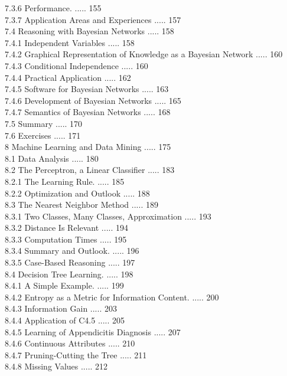 \documentclass[10pt]{book}
\begin{document}
7.3.6 Performance. ..... 155\\
7.3.7 Application Areas and Experiences ..... 157\\
7.4 Reasoning with Bayesian Networks ..... 158\\
7.4.1 Independent Variables ..... 158\\
7.4.2 Graphical Representation of Knowledge as a Bayesian Network ..... 160\\
7.4.3 Conditional Independence ..... 160\\
7.4.4 Practical Application ..... 162\\
7.4.5 Software for Bayesian Networks ..... 163\\
7.4.6 Development of Bayesian Networks ..... 165\\
7.4.7 Semantics of Bayesian Networks ..... 168\\
7.5 Summary ..... 170\\
7.6 Exercises ..... 171\\
8 Machine Learning and Data Mining ..... 175\\
8.1 Data Analysis ..... 180\\
8.2 The Perceptron, a Linear Classifier ..... 183\\
8.2.1 The Learning Rule. ..... 185\\
8.2.2 Optimization and Outlook ..... 188\\
8.3 The Nearest Neighbor Method ..... 189\\
8.3.1 Two Classes, Many Classes, Approximation ..... 193\\
8.3.2 Distance Is Relevant ..... 194\\
8.3.3 Computation Times ..... 195\\
8.3.4 Summary and Outlook. ..... 196\\
8.3.5 Case-Based Reasoning ..... 197\\
8.4 Decision Tree Learning. ..... 198\\
8.4.1 A Simple Example. ..... 199\\
8.4.2 Entropy as a Metric for Information Content. ..... 200\\
8.4.3 Information Gain ..... 203\\
8.4.4 Application of C4.5 ..... 205\\
8.4.5 Learning of Appendicitis Diagnosis ..... 207\\
8.4.6 Continuous Attributes ..... 210\\
8.4.7 Pruning-Cutting the Tree ..... 211\\
8.4.8 Missing Values ..... 212\\
\end{document}
